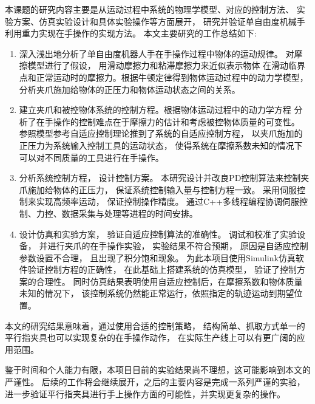 \begin{conclusion}
本课题的研究内容主要是从运动过程中系统的物理学模型、对应的控制方法、
实验方案、仿真实验设计和具体实验操作等方面展开，
研究并验证单自由度机械手利用重力实现在手操作的实现方法。
本文主要研究的工作总结如下:

\begin{enumerate}[labelsep =.5em, leftmargin = 0pt, itemindent = 3em,  
  itemsep=0pt, partopsep = 0pt, topsep = 5pt, itemsep = 5pt, parsep = 0pt]
  \renewcommand{\labelenumi}{(\theenumi)}
  \item 深入浅出地分析了单自由度机器人手在手操作过程中物体的运动规律。
    对摩擦模型进行了假设， 用滑动摩擦力和粘滞摩擦力来近似表示物体
    在滑动临界点和正常运动时的摩擦力。根据牛顿定律得到物体运动过程中的动力学模型，
    分析夹爪施加给物体的正压力和物体运动状态之间的关系。
  \item 建立夹爪和被控物体系统的控制方程。根据物体运动过程中的动力学方程
    分析了在手操作的控制难点在于摩擦力的估计和考虑被控物体质量的可变性。
    参照模型参考自适应控制理论推到了系统的自适应控制方程， 
    以夹爪施加的正压力为系统输入控制工具的运动状态，
    使得系统在摩擦系数未知的情况下可以对不同质量的工具进行在手操作。
  \item 分析系统控制方程， 设计控制方案。
    本研究设计并改良PD控制算法来控制夹爪施加给物体的正压力， 
    保证系统控制输入量与控制方程一致。
    采用伺服控制来实现高频率运动， 保证控制操作精度。
    通过C++多线程编程协调伺服控制、力控、数据采集与处理等进程的时间安排。
  \item 设计仿真和实验方案， 验证自适应控制算法的准确性。
    调试和校准了实验设备， 并进行夹爪的在手操作实验， 实验结果不符合预期， 
    原因是自适应控制参数设置不合理， 且出现了积分饱和现象。
    为此本项目使用Simulink仿真软件验证控制方程的正确性， 在此基础上搭建系统的仿真模型，
    验证了控制方案的合理性。
    同时仿真结果表明使用自适应控制后，在摩擦系数和物体质量未知的情况下，
    该控制系统仍然能正常运行，依照指定的轨迹运动到期望位置。
\end{enumerate}

本文的研究结果意味着，通过使用合适的控制策略，
结构简单、抓取方式单一的平行指夹具也可以实现复杂的在手操作动作，
在实际生产线上可以有更广阔的应用范围。

鉴于时间和个人能力有限，本项目目前的实验结果尚不理想，这可能影响到本文的严谨性。
后续的工作将会继续展开，之后的主要内容是完成一系列严谨的实验，
进一步验证平行指夹具进行手上操作方面的可能性，并实现更复杂的操作。
    
\end{conclusion}


